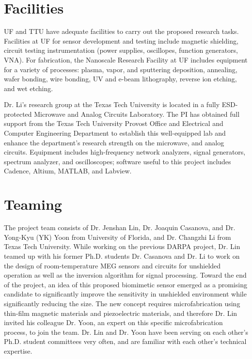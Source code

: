 \section{Facilities}
UF and TTU have adequate facilities to carry out the proposed research tasks.
Facilities at UF for sensor development and testing include magnetic shielding, circuit testing instrumentation (power supplies, oscillopes, function generators, VNA). For fabrication, the Nanoscale Research Facility at UF includes equipment for a variety of processes: plasma, vapor, and sputtering deposition, annealing, wafer bonding, wire bonding, UV and e-beam lithography, reverse ion etching, and wet etching.

Dr. Li’s research group at the Texas Tech University is located in a fully ESD-protected Microwave and Analog Circuits Laboratory. The PI has obtained full support from the Texas Tech University Provost Office and Electrical and Computer Engineering Department to establish this well-equipped lab and enhance the department’s research strength on the microwave, and analog circuits. Equipment includes high-frequency network analyzers, signal generators, spectrum analyzer, and oscilloscopes; software useful to this project includes Cadence, Altium, MATLAB, and Labview.

\section{Teaming}
The project team consists of Dr. Jenshan Lin, Dr. Joaquin Casanova, and Dr. Yong-Kyu (YK) Yoon from University of Florida, and Dr. Changzhi Li from Texas Tech University. While working on the previous DARPA project, Dr. Lin teamed up with his former Ph.D. students Dr. Casanova and Dr. Li to work on the design of room-temperature MEG sensors and circuits for unshielded operation as well as the inversion algorithm for signal processing. Toward the end of the project, an idea of this proposed biomimetic sensor emerged as a promising candidate to significantly improve the sensitivity in unshielded environment while significantly reducing the size. The new concept requires microfabrication using thin-film magnetic materials and piezoelectric materials, and therefore Dr. Lin invited his colleague Dr. Yoon, an expert on this specific microfabrication process, to join the team. Dr. Lin and Dr. Yoon have been serving on each other’s Ph.D. student committees very often, and are familiar with each other’s technical expertise.

